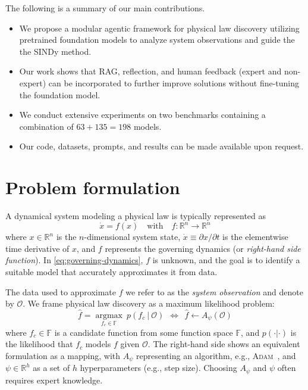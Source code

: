 \documentclass{article}
\begin{document}
The following is a summary of our main contributions.
\begin{itemize}
    \item We propose a modular agentic framework for physical law discovery utilizing pretrained foundation models to analyze system observations and guide the the SINDy method.
    \item Our work shows that RAG, reflection, and human feedback (expert and non-expert) can be incorporated to further improve solutions without fine-tuning the foundation model.
    \item We conduct extensive experiments on two benchmarks containing a combination of $63+135=198$ models.
    \item Our code, datasets, prompts, and results can be made available upon request.
\end{itemize}

\section{Problem formulation}\label{eq:problem-formulation}

A dynamical system modeling a physical law is typically represented as
\begin{equation}\label{eq:governing-dynamics}
    \dot{x} = f(x)\quad\text{with}\quad f:\mathbb{R}^n\rightarrow\mathbb{R}^n
\end{equation}
where 
$x \in \mathbb{R}^n$ is the $n$-dimensional system state, 
$\dot{x} \equiv \partial x/\partial t$ is the elementwise time derivative of $x$, and 
$f$ represents the governing dynamics (or \textit{right-hand side function}). 
In \eqref{eq:governing-dynamics}, $f$ is unknown, and the goal is to identify a suitable model that accurately approximates it from data.

The data used to approximate $f$ we refer to as the \textit{system observation} and denote by $\mathcal{O}$. We frame physical law discovery as a maximum likelihood problem:
\begin{equation}
    \label{eq:governing-dynamics-discovery}
    \widehat{f} = \underset{f_c\in\mathbb{F}}{\text{arg}\max}~p(f_c~|~\mathcal{O})~~\Leftrightarrow~~\widehat{f}\leftarrow A_\psi(\mathcal{O}) 
\end{equation}
where $f_c \in \mathbb{F}$ is a candidate function from some function space $\mathbb{F}$, and $p(\cdot | \cdot)$ is the likelihood that $f_c$ models $f$ given $\mathcal{O}$. The right-hand side shows an equivalent formulation as a mapping, with $A_\psi$ representing an algorithm, e.g., \textsc{Adam}~\cite{kingma2017adam}, and $\psi \in \mathbb{R}^h$ as a set of $h$ hyperparameters (e.g., step size). Choosing $A_\psi$ and $\psi$ often requires expert knowledge.
\end{document}
